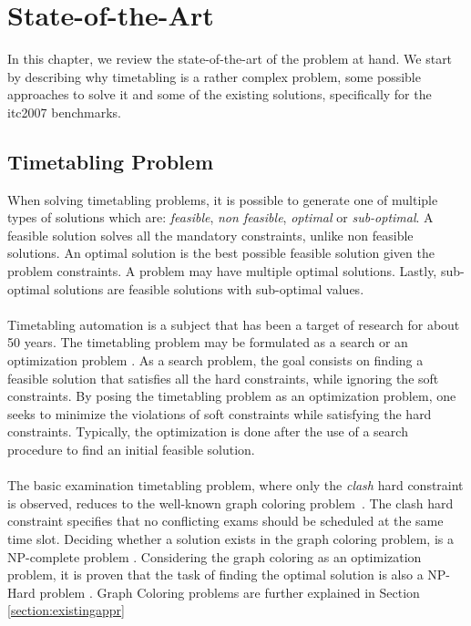 \chapter{State-of-the-Art}
\label{chap:stateofart}
\thispagestyle{plain}

In this chapter, we review the state-of-the-art of the problem at hand. We start by describing why timetabling is a rather complex problem, some possible approaches to solve it and some of the existing solutions, specifically for the \gls{itc2007} benchmarks.\\

\section{Timetabling Problem}

When solving timetabling problems, it is possible to generate one of multiple types of solutions which are: \textit{feasible}, \textit{non feasible}, \textit{optimal} or \textit{sub-optimal}. A feasible solution solves all the mandatory constraints, unlike non feasible solutions. An optimal solution is the best possible feasible solution given the problem constraints. A problem may have multiple optimal solutions. Lastly, sub-optimal solutions are feasible solutions with sub-optimal values.\\
\\
Timetabling automation is a subject that has been a target of research for about 50 years. The timetabling problem may be formulated as a search or an optimization problem \cite{Schaerf1999}. As a search problem, the goal consists on finding a feasible solution that satisfies all the hard constraints, while ignoring the soft constraints. By posing the timetabling problem as an optimization problem, one seeks to minimize the violations of soft constraints while satisfying the hard constraints. Typically, the optimization is done after the use of a search procedure to find an initial feasible solution.\\
\\
The basic examination timetabling problem, where only the \textit{clash} hard constraint is observed, reduces to the well-known graph coloring problem~\cite{Jensen2001}. The clash hard constraint specifies that no conflicting exams should be scheduled at the same time slot. Deciding whether a solution exists in the graph coloring problem, is a NP-complete \cite{Arora2009} problem \cite{Qu2009}. Considering the graph coloring as an optimization problem, it is proven that the task of finding the optimal solution is also a NP-Hard \cite{Arora2009} problem \cite{Qu2009}. Graph Coloring problems are further explained in Section \ref{section:existingappr}
\\

